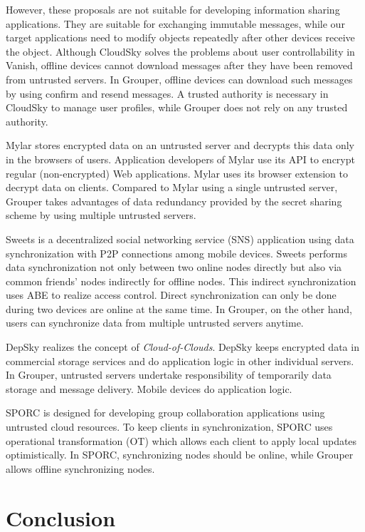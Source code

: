 However, these proposals are not suitable for developing information sharing applications. 
They are suitable for exchanging immutable messages, while our target applications need to modify objects repeatedly after other devices receive the object. 
Although CloudSky solves the problems about user controllability in Vanish, offline devices cannot download messages after they have been removed from untrusted servers.
In Grouper, offline devices can download such messages by using confirm and resend messages.
A trusted authority is necessary in CloudSky to manage user profiles, while Grouper does not rely on any trusted authority.

Mylar\cite{popa2014building} stores encrypted data on an untrusted server and decrypts this data only in the browsers of users. 
Application developers of Mylar use its API to encrypt regular (non-encrypted) Web applications. 
Mylar uses its browser extension to decrypt data on clients. 
Compared to Mylar using a single untrusted server, Grouper takes advantages of data redundancy provided by the secret sharing scheme by using multiple untrusted servers.

Sweets\cite{sweets} is a decentralized social networking service (SNS) application using data synchronization with P2P connections among mobile devices. 
Sweets performs data synchronization not only between two online nodes directly but also via common friends' nodes indirectly for offline nodes.
This indirect synchronization uses ABE to realize access control.
Direct synchronization can only be done during two devices are online at the same time. 
In Grouper, on the other hand, users can synchronize data from multiple untrusted servers anytime.

DepSky\cite{bessani2013depsky} realizes the concept of \emph{Cloud-of-Clouds}.  
DepSky keeps encrypted data in commercial storage services and do application logic in other individual servers.
In Grouper, untrusted servers undertake responsibility of temporarily data storage and message delivery.
Mobile devices do application logic.

SPORC\cite{feldman2010sporc} is designed for developing group collaboration applications using untrusted cloud resources.
To keep clients in synchronization, SPORC uses operational transformation (OT) which allows each client to apply local updates optimistically.
In SPORC, synchronizing nodes should be online, while Grouper allows offline synchronizing nodes.

\section{Conclusion}

